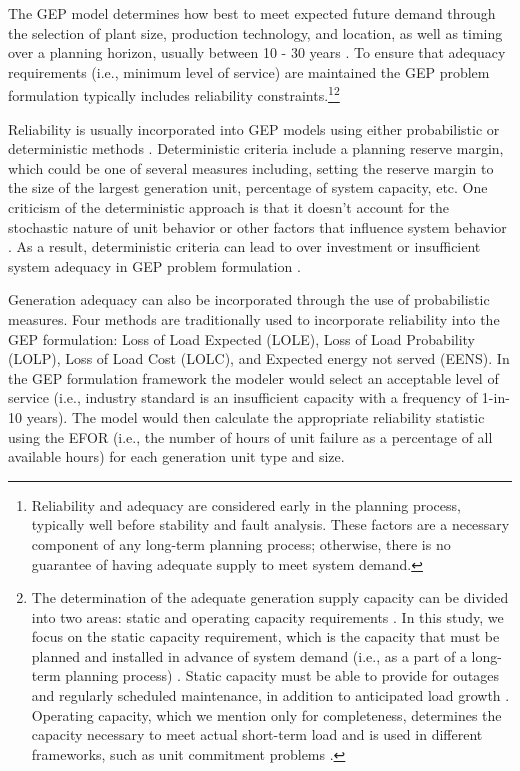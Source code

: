 \documentclass[10pt]{amsart}
\begin{document}
The GEP model determines how best to meet expected future demand through the selection of plant size, production technology, and location, as well as timing over a planning horizon, usually between 10 - 30 years \parencite{hemmati:2013ab}. 
To ensure that adequacy requirements (i.e., minimum level of service) are maintained the GEP problem formulation typically includes reliability constraints.\footnote{Reliability and adequacy are considered early in the planning process, typically well before stability and fault analysis. These factors are a necessary component of any long-term planning process; otherwise, there is no guarantee of having adequate supply to meet system demand.}\footnote{The determination of the adequate generation supply capacity can be divided into two areas: static and operating capacity requirements \parencite{billinton1984reliability}.
In this study, we focus on the static capacity requirement, which is the capacity that must be planned and installed in advance of system demand (i.e., as a part of a long-term planning process) \parencite{billinton1984reliability}.
Static capacity must be able to provide for outages and regularly scheduled maintenance, in addition to anticipated load growth \parencite{billinton1984reliability}.
Operating capacity, which we mention only for completeness, determines the capacity necessary to meet actual short-term load and is used in different frameworks, such as unit commitment problems \parencite{billinton1984reliability}.}
	 
Reliability is usually incorporated into GEP models using either probabilistic or deterministic methods \parencite{aghaei:2013aa}. 
Deterministic criteria include a planning reserve margin, which could be one of several measures including, setting the reserve margin to the size of the largest generation unit, percentage of system capacity, etc. 
One criticism of the deterministic approach is that it doesn't account for the stochastic nature of unit behavior or other factors that influence system behavior \parencite{aghaei:2013aa}.
As a result, deterministic criteria can lead to over investment or insufficient system adequacy in GEP problem formulation \parencite{aghaei:2013aa}.  
	
Generation adequacy can also be incorporated through the use of probabilistic measures. 
Four methods are traditionally used to incorporate reliability into the GEP formulation: Loss of Load Expected (LOLE), Loss of Load Probability (LOLP), Loss of Load Cost (LOLC), and Expected energy not served (EENS).
In the GEP formulation framework the modeler would select an acceptable level of service (i.e., industry standard is an insufficient capacity with a frequency of 1-in-10 years)\parencite{}. 
The model would then calculate the appropriate reliability statistic using the EFOR (i.e., the number of hours of unit failure as a percentage of all available hours) for each generation unit type and size.
	
\end{document}
